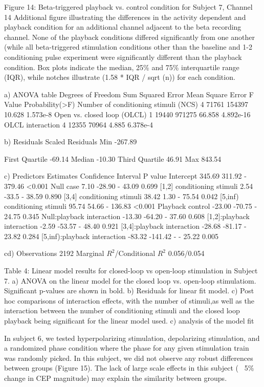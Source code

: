 Figure 14: Beta-triggered playback vs. control condition for Subject 7, Channel 14
Additional figure illustrating the differences in the activity dependent and playback condition for an additional channel adjacent to the beta recording channel. None of the playback conditions differed significantly from one another (while all beta-triggered stimulation conditions other than the baseline and 1-2 conditioning pulse experiment were significantly different than the playback condition. Box plots indicate the median, 25\% and 75\% interquartile range (IQR), while notches illustrate (1.58 * IQR  / sqrt (n)) for each condition. 


a)
ANOVA table 
Degrees of Freedom	Sum Squared Error	Mean Square Error	F Value	Probability(>F)
Number of conditioning stimuli (NCS)	4	71761	154397	10.628	1.573e-8
Open vs. closed loop (OLCL)	1	19440	971275	66.858	4.892e-16
OLCL interaction	4	12355	70964	4.885	6.378e-4

b)
Residuals
Scaled Residuals	Min
-267.89

First Quartile
-69.14	Median
-10.30	Third Quartile
46.91
Max
843.54

c)
Predictors	Estimates	Confidence Interval 	P value
Intercept	345.69	311.92 - 379.46	<0.001
Null case	7.10	-28.90 - 43.09	0.699
[1,2] conditioning stimuli	2.54	-33.5 - 38.59	0.890
[3,4] conditioning stimuli	38.42	1.30 - 75.54	0.042
[5,inf) conditioning stimuli	95.74	54.66 - 136.83	<0.001
Playback control	-23.00	-70.75 - 24.75	0.345
Null:playback interaction	-13.30	-64.20 - 37.60	0.608
[1,2]:playback interaction	-2.59	-53.57 - 48.40	0.921
[3,4]:playback interaction	-28.68	-81.17 - 23.82	0.284
[5,inf):playback interaction	-83.32	-141.42 -  - 25.22	0.005

cd)
Observations	2192
Marginal $R^2$/Conditional $R^2$	0.056/0.054

Table 4: Linear model results for closed-loop vs open-loop stimulation in Subject 7. a) ANOVA on the linear model for the closed loop vs. open-loop stimulatiom. Significant p-values are shown in bold. b) Residuals for linear fit model. c) Post hoc comparisons of interaction effects, with the number of stimuli,as well as the interaction between the number of conditioning stimuli and the closed loop playback being significant for the linear model used. c) analysis of the model fit

In subject 6, we tested hyperpolarizing stimulation, depolarizing stimulation, and a randomized phase condition where the phase for any given stimulation train was randomly picked. In this subject, we did not observe any robust differences between groups (Figure 15). The lack of large scale effects in this subject (~ 5\% change in CEP magnitude) may explain the similarity between groups.



